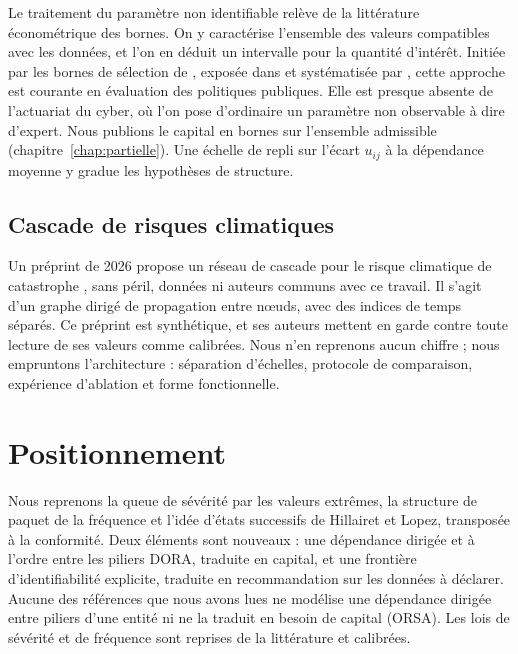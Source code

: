 Le traitement du paramètre non identifiable relève de la littérature économétrique des bornes. On y
caractérise l'ensemble des valeurs compatibles avec les données, et l'on en déduit un intervalle pour
la quantité d'intérêt. Initiée par les bornes de sélection de \citet{Manski1990}, exposée dans
\citet{Manski1995} et systématisée par \citet{Tamer2010}, cette approche est courante en évaluation
des politiques publiques. Elle est presque absente de l'actuariat du cyber, où l'on pose d'ordinaire
un paramètre non observable à dire d'expert. Nous publions le capital en bornes sur l'ensemble admissible
(chapitre~\ref{chap:partielle}). Une échelle de repli sur l'écart $u_{ij}$ à la dépendance moyenne y gradue les hypothèses de
structure.

\subsection*{Cascade de risques climatiques}
Un préprint de 2026 propose un réseau de cascade pour le
risque climatique de catastrophe \citep{ccrn2026}, sans péril, données ni auteurs communs avec ce
travail. Il s'agit d'un graphe dirigé de propagation entre n\oe uds, avec des indices de temps
séparés. Ce préprint est synthétique, et ses auteurs mettent en garde contre toute lecture de ses
valeurs comme calibrées. Nous n'en reprenons aucun chiffre ; nous empruntons l'architecture : séparation d'échelles, protocole de comparaison, expérience d'ablation et forme
fonctionnelle.

\section{Positionnement}

Nous reprenons la queue de sévérité par les valeurs extrêmes, la structure de paquet de la fréquence
et l'idée d'états successifs de Hillairet et Lopez, transposée à la conformité. Deux éléments sont nouveaux : une
dépendance dirigée et à l'ordre entre les piliers DORA, traduite en capital, et une frontière
d'identifiabilité explicite, traduite en recommandation sur les données à déclarer. Aucune des références que nous avons lues ne modélise une dépendance dirigée entre piliers d'une entité ni ne la traduit en besoin de capital (ORSA). Les lois de sévérité et de fréquence sont reprises de la littérature et calibrées.

\nocite{BohmeKataria2006, HerathHerath2011, HillairetLopez2021,
  HillairetLopezDOultremontSpoorenberg2022, XuHua2017, Baldwin2017,
  BessyRolandBoumezouedHillairet2021, BoumezouedCherkaouiHillairet2023,
  HillairetReveillacRosenbaum2021, Peng2016, Edwards2016, LuZhangZhu2024,
  FarkasLopezThomas2021, Vasicek2002, Leontief1936}
